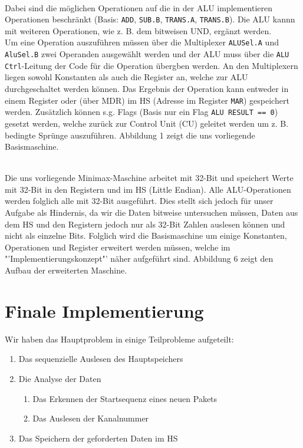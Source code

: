 \documentclass[12pt,titlepage]{article}
\begin{document}
\leavevmode \\
Dabei sind die m{\"o}glichen Operationen auf die in der ALU implementieren
Operationen beschr{\"a}nkt (Basis: \texttt{ADD}, \texttt{SUB.B}, \texttt{TRANS.A}, \texttt{TRANS.B}). Die ALU kannn mit weiteren Operationen,
wie z. B. dem bitweisen UND, erg{\"a}nzt werden.\\
Um eine Operation auszuf{\"u}hren m{\"u}ssen {\"u}ber die Multiplexer \texttt{ALUSel.A} und \texttt{AluSel.B} zwei Operanden ausgew{\"a}hlt werden
und der ALU muss {\"u}ber die \texttt{ALU Ctrl}-Leitung der Code f{\"u}r die Operation {\"u}bergben werden. An den Multiplexern liegen sowohl
Konstanten als auch die Register an, welche zur ALU durchgeschaltet werden k{\"o}nnen. Das Ergebnis der Operation kann
entweder in einem Register oder (über MDR) im HS (Adresse im Register \texttt{MAR}) gespeichert werden. Zus{\"a}tzlich k{\"o}nnen s.g. Flags (Basis nur ein Flag \texttt{ALU RESULT == 0})
gesetzt werden, welche zur{\"u}ck zur Control Unit (CU) geleitet werden um z. B. bedingte Spr{\"u}nge auszuf{\"u}hren.
Abbildung 1 zeigt die uns vorliegende Basismaschine.

\leavevmode \\
Die uns vorliegende Minimax-Maschine arbeitet mit 32-Bit und speichert Werte mit 32-Bit in den Registern und im HS (\dq Little Endian\dq ).
Alle ALU-Operationen werden folglich alle mit 32-Bit ausgef{\"u}hrt. Dies stellt sich jedoch f{\"u}r unser Aufgabe als
Hindernis, da wir die Daten bitweise untersuchen m{\"u}ssen, Daten aus dem HS und den Registern jedoch nur als
32-Bit Zahlen auslesen k{\"o}nnen und nicht als einzelne Bits.
Folglich wird die Basismaschine um einige Konstanten, Operationen und Register erweitert werden müssen, welche im "'Implementierungskonzept"' n{\"a}her
aufgeführt sind. Abbildung 6 zeigt den Aufbau der erweiterten Maschine.

\newpage

\section{Finale Implementierung}
Wir haben das Hauptproblem in einige Teilprobleme aufgeteilt:
\begin{enumerate}
\item Das sequenzielle Auslesen des Hauptspeichers
\item Die Analyse der Daten
    \begin{enumerate}
    \item Das Erkennen der Startsequenz eines neuen Pakets
    \item Das Auslesen der Kanalnummer
    \end{enumerate}
\item Das Speichern der geforderten Daten im HS
\end{enumerate}
\end{document}
